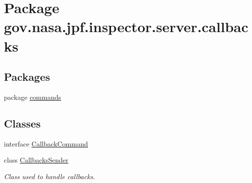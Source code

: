 \hypertarget{namespacegov_1_1nasa_1_1jpf_1_1inspector_1_1server_1_1callbacks}{}\section{Package gov.\+nasa.\+jpf.\+inspector.\+server.\+callbacks}
\label{namespacegov_1_1nasa_1_1jpf_1_1inspector_1_1server_1_1callbacks}
\subsection*{Packages}
\begin{DoxyCompactItemize}
\item 
package \hyperlink{namespacegov_1_1nasa_1_1jpf_1_1inspector_1_1server_1_1callbacks_1_1commands}{commands}
\end{DoxyCompactItemize}
\subsection*{Classes}
\begin{DoxyCompactItemize}
\item 
interface \hyperlink{interfacegov_1_1nasa_1_1jpf_1_1inspector_1_1server_1_1callbacks_1_1_callback_command}{Callback\+Command}
\item 
class \hyperlink{classgov_1_1nasa_1_1jpf_1_1inspector_1_1server_1_1callbacks_1_1_callbacks_sender}{Callbacks\+Sender}
\begin{DoxyCompactList}\small\item\em Class used to handle callbacks. \end{DoxyCompactList}\end{DoxyCompactItemize}
